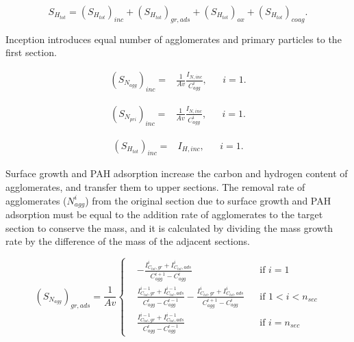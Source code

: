 \begin{equation}
	S_{H_{tot}} = 
	\left(S_{H_{tot}}\right)_{inc}
	+\left(S_{H_{tot}}\right)_{gr, ads}
	+\left(S_{H_{tot}}\right)_{ox}
	+\left(S_{H_{tot}}\right)_{coag}
	\label{eqn:S_Htotsect}.
\end{equation}

Inception introduces equal number of agglomerates and primary particles to the first section.

\begin{equation}
	\begin{aligned}
	\left(S_{N_{agg}}\right)_{inc} =
	&\frac{1}{Av}\frac{I_{N, inc}}{C^i_{agg}}, && i=1.
	\end{aligned}
	\label{eqn:S_Nagg_incsect}
\end{equation}

\begin{equation}
	\begin{aligned}
	\left(S_{N_{pri}}\right)_{inc} =
	&\frac{1}{Av}\frac{I_{N, inc}}{C^i_{agg}}, && i=1.
	\end{aligned}
	\label{eqn:S_Npri_incsect}
\end{equation}

\begin{equation}
	\begin{aligned}
		\left(S_{H_{tot}}\right)_{inc} =
		&I_{H, inc}, && i=1.
	\end{aligned}
	\label{eqn:S_Htot_incsect}
\end{equation}

Surface growth and PAH adsorption increase the carbon and hydrogen content of agglomerates, and transfer them to upper sections. The removal rate of agglomerates (${N^i_{agg}}$) from the original section due to surface growth and PAH adsorption must be equal to the addition rate of agglomerates to the target section to conserve the mass, and it is calculated by dividing the mass growth rate by the difference of the mass of the adjacent sections.

\begin{equation}
	\left(S_{N_{agg}}\right)_{gr, ads}=
	\frac{1}{Av}
	\left\{
	\begin{aligned}
		&-\frac{I^i_{C_{tot},gr}+I^i_{C_{tot},ads}}{C^{i+1}_{agg}-C^{i}_{agg}}
		&&
		\text{if } i = 1
		\\
		&\frac{I^{i-1}_{C_{tot},gr}+I^{i-1}_{C_{tot},ads}}{C^{i}_{agg}-C^{i-1}_{agg}}
		-\frac{I^{i}_{C_{tot},gr}+I^{i}_{C_{tot},ads}}{C^{i+1}_{agg}-C^{i}_{agg}}
		&&
		\text{if } 1 < i < n_{sec}
		\\
		&\frac{I^{i-1}_{C_{tot},gr}+I^{i-1}_{C_{tot},ads}}{C^{i}_{agg}-C^{i-1}_{agg}}
		&&\text{if } i=n_{sec}
	\end{aligned}
	\right.
	\label{eqn:S_Nagg_gradssect}
\end{equation}


